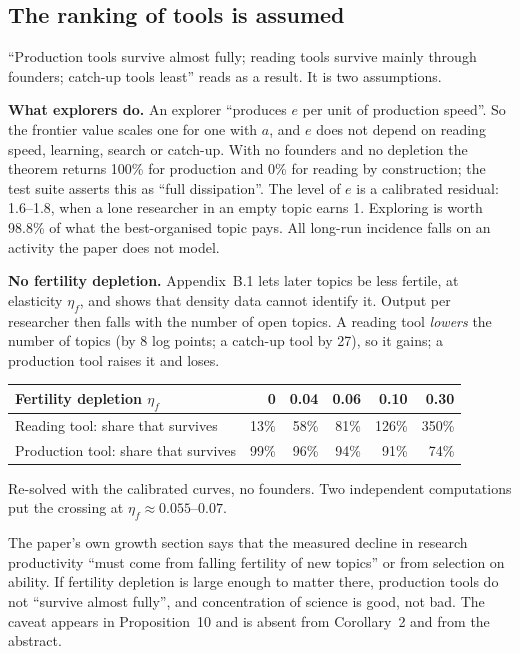 \subsection{The ranking of tools is assumed}\label{sec:crit-ranking}

``Production tools survive almost fully; reading tools survive mainly through founders; catch-up tools least'' reads as a result. It is two assumptions.

\textbf{What explorers do.} An explorer ``produces $e$ per unit of production speed''. So the frontier value scales one for one with $a$, and $e$ does not depend on reading speed, learning, search or catch-up. With no founders and no depletion the theorem returns 100\% for production and 0\% for reading by construction; the test suite asserts this as ``full dissipation''. The level of $e$ is a calibrated residual: 1.6--1.8, when a lone researcher in an empty topic earns 1. Exploring is worth 98.8\% of what the best-organised topic pays. All long-run incidence falls on an activity the paper does not model.

\textbf{No fertility depletion.} Appendix~B.1 lets later topics be less fertile, at elasticity $\eta_f$, and shows that density data cannot identify it. Output per researcher then falls with the number of open topics. A reading tool \emph{lowers} the number of topics (by 8 log points; a catch-up tool by 27), so it gains; a production tool raises it and loses.

\begin{center}\small
\begin{tabularx}{0.8\textwidth}{@{}Lrrrrr@{}}
\toprule
Fertility depletion $\eta_f$ & 0 & 0.04 & 0.06 & 0.10 & 0.30 \\
\midrule
Reading tool: share that survives & 13\% & 58\% & 81\% & 126\% & 350\% \\
Production tool: share that survives & 99\% & 96\% & 94\% & 91\% & 74\% \\
\bottomrule
\end{tabularx}
\par\smallskip
\parbox{0.8\textwidth}{\footnotesize Re-solved with the calibrated curves, no founders. Two independent computations put the crossing at $\eta_f\approx0.055$--$0.07$.}
\end{center}

The paper's own growth section says that the measured decline in research productivity ``must come from falling fertility of new topics'' or from selection on ability. If fertility depletion is large enough to matter there, production tools do not ``survive almost fully'', and concentration of science is good, not bad. The caveat appears in Proposition~10 and is absent from Corollary~2 and from the abstract.

